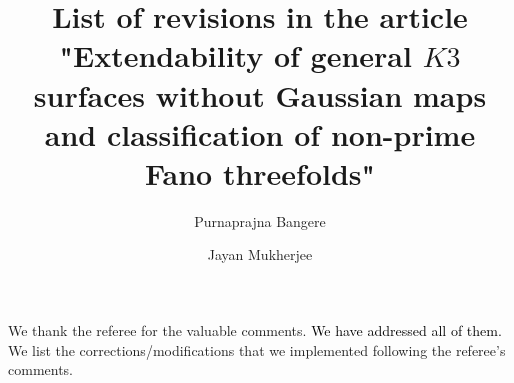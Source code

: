 \documentclass[11pt,twoside]{amsart}
\theoremstyle{plain}
\numberwithin{equation}{section}
\theoremstyle{definition}
\begin{document}
\title[List of corrections]{List of revisions in the article "Extendability of general $K3$ surfaces without Gaussian maps and classification of non-prime Fano threefolds"}
\author[P. Bangere]{Purnaprajna Bangere}


\author[J. Mukherjee]{Jayan Mukherjee}






\maketitle

We thank the referee for the valuable comments. \textcolor{black}{We have addressed all of them.} We list the corrections/modifications that we implemented following the referee's comments.

\smallskip
\end{document}
